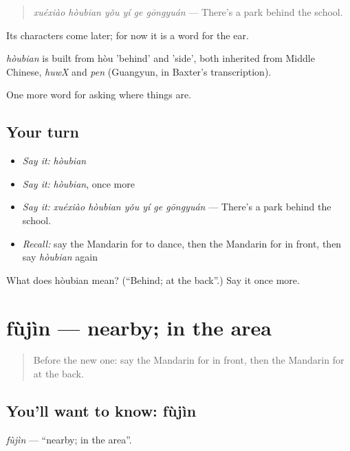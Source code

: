 \begin{quote}
\emph{xuéxiào hòubian yǒu yí ge gōngyuán} — There's a park behind the school.
\end{quote}

Its characters come later; for now it is a word for the ear.

\begin{cousinweb}
\emph{hòubian} is built from hòu 'behind' and  'side', both inherited from Middle Chinese, \emph{huwX} and \emph{pen} (Guangyun, in Baxter's transcription).
\end{cousinweb}

\begin{grammarlens}[title={What you've built}]
One more word for asking where things are.
\end{grammarlens}

\subsection*{Your turn}
\begin{itemize}
\raggedright
  \item \emph{Say it:} \emph{hòubian}
  \item \emph{Say it:} \emph{hòubian}, once more
  \item \emph{Say it:} \emph{xuéxiào hòubian yǒu yí ge gōngyuán} — There's a park behind the school.
  \item \emph{Recall:} say the Mandarin for to dance, then the Mandarin for in front, then say \emph{hòubian} again
\end{itemize}

\begin{tcolorbox}[breakable,colback=teal!4,colframe=teal!35!black,title={Before you move on}]
What does hòubian mean? (\textquotedblleft{}Behind; at the back\textquotedblright{}.) Say it once more.
\end{tcolorbox}
\section[fùjìn]{fùjìn — nearby; in the area}

\label{lesson:ZH-C111-fujin}



\begin{quote}
Before the new one: say the Mandarin for in front, then the Mandarin for at the back.
\end{quote}

\subsection*{You'll want to know: fùjìn}
\emph{fùjìn} — \textquotedblleft{}nearby; in the area\textquotedblright{}.


